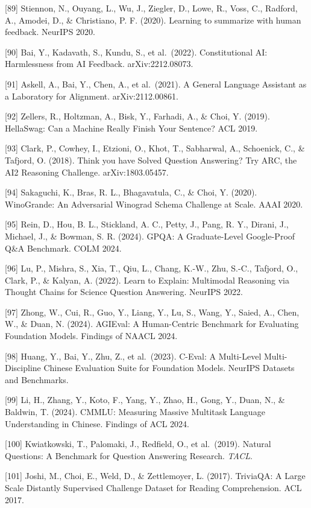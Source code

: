 {[}89{]} Stiennon, N., Ouyang, L., Wu, J., Ziegler, D., Lowe, R., Voss, C., Radford, A., Amodei, D., \& Christiano, P. F. (2020). Learning to summarize with human feedback. NeurIPS 2020.

{[}90{]} Bai, Y., Kadavath, S., Kundu, S., et al.~(2022). Constitutional AI: Harmlessness from AI Feedback. arXiv:2212.08073.

{[}91{]} Askell, A., Bai, Y., Chen, A., et al.~(2021). A General Language Assistant as a Laboratory for Alignment. arXiv:2112.00861.

{[}92{]} Zellers, R., Holtzman, A., Bisk, Y., Farhadi, A., \& Choi, Y. (2019). HellaSwag: Can a Machine Really Finish Your Sentence? ACL 2019.

{[}93{]} Clark, P., Cowhey, I., Etzioni, O., Khot, T., Sabharwal, A., Schoenick, C., \& Tafjord, O. (2018). Think you have Solved Question Answering? Try ARC, the AI2 Reasoning Challenge. arXiv:1803.05457.

{[}94{]} Sakaguchi, K., Bras, R. L., Bhagavatula, C., \& Choi, Y. (2020). WinoGrande: An Adversarial Winograd Schema Challenge at Scale. AAAI 2020.

{[}95{]} Rein, D., Hou, B. L., Stickland, A. C., Petty, J., Pang, R. Y., Dirani, J., Michael, J., \& Bowman, S. R. (2024). GPQA: A Graduate-Level Google-Proof Q\&A Benchmark. COLM 2024.

{[}96{]} Lu, P., Mishra, S., Xia, T., Qiu, L., Chang, K.-W., Zhu, S.-C., Tafjord, O., Clark, P., \& Kalyan, A. (2022). Learn to Explain: Multimodal Reasoning via Thought Chains for Science Question Answering. NeurIPS 2022.

{[}97{]} Zhong, W., Cui, R., Guo, Y., Liang, Y., Lu, S., Wang, Y., Saied, A., Chen, W., \& Duan, N. (2024). AGIEval: A Human-Centric Benchmark for Evaluating Foundation Models. Findings of NAACL 2024.

{[}98{]} Huang, Y., Bai, Y., Zhu, Z., et al.~(2023). C-Eval: A Multi-Level Multi-Discipline Chinese Evaluation Suite for Foundation Models. NeurIPS Datasets and Benchmarks.

{[}99{]} Li, H., Zhang, Y., Koto, F., Yang, Y., Zhao, H., Gong, Y., Duan, N., \& Baldwin, T. (2024). CMMLU: Measuring Massive Multitask Language Understanding in Chinese. Findings of ACL 2024.

{[}100{]} Kwiatkowski, T., Palomaki, J., Redfield, O., et al.~(2019). Natural Questions: A Benchmark for Question Answering Research. \emph{TACL}.

{[}101{]} Joshi, M., Choi, E., Weld, D., \& Zettlemoyer, L. (2017). TriviaQA: A Large Scale Distantly Supervised Challenge Dataset for Reading Comprehension. ACL 2017.


